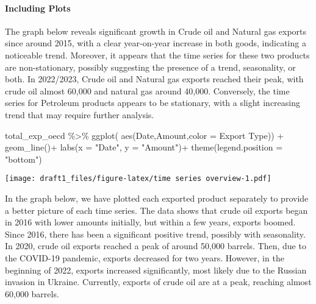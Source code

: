 \documentclass[
]{article}
\newenvironment{Shaded}{\begin{snugshade}}{\end{snugshade}}
\newcommand{\AttributeTok}[1]{\textcolor[rgb]{0.77,0.63,0.00}{#1}}
\newcommand{\FunctionTok}[1]{\textcolor[rgb]{0.00,0.00,0.00}{#1}}
\newcommand{\NormalTok}[1]{#1}
\newcommand{\SpecialCharTok}[1]{\textcolor[rgb]{0.00,0.00,0.00}{#1}}
\newcommand{\StringTok}[1]{\textcolor[rgb]{0.31,0.60,0.02}{#1}}
\begin{document}
\hypertarget{including-plots}{%
\paragraph{Including Plots}\label{including-plots}}

The graph below reveals significant growth in Crude oil and Natural gas
exports since around 2015, with a clear year-on-year increase in both
goods, indicating a noticeable trend. Moreover, it appears that the time
series for these two products are non-stationary, possibly suggesting
the presence of a trend, seasonality, or both. In 2022/2023, Crude oil
and Natural gas exports reached their peak, with crude oil almost 60,000
and natural gas around 40,000. Conversely, the time series for Petroleum
products appears to be stationary, with a slight increasing trend that
may require further analysis.

\begin{Shaded}
\begin{Highlighting}[]
\NormalTok{total\_exp\_oecd }\SpecialCharTok{\%\textgreater{}\%} \FunctionTok{ggplot}\NormalTok{(}
 \FunctionTok{aes}\NormalTok{(Date,Amount,}\AttributeTok{color =} \StringTok{\textasciigrave{}}\AttributeTok{Export Type}\StringTok{\textasciigrave{}}\NormalTok{)) }\SpecialCharTok{+}
   \FunctionTok{geom\_line}\NormalTok{()}\SpecialCharTok{+}
   \FunctionTok{labs}\NormalTok{(}\AttributeTok{x =} \StringTok{"Date"}\NormalTok{, }\AttributeTok{y =} \StringTok{"Amount"}\NormalTok{)}\SpecialCharTok{+}
  \FunctionTok{theme}\NormalTok{(}\AttributeTok{legend.position =} \StringTok{"bottom"}\NormalTok{)}
\end{Highlighting}
\end{Shaded}

\texttt{[image: draft1\_files/figure-latex/time series overview-1.pdf]}

In the graph below, we have plotted each exported product separately to
provide a better picture of each time series. The data shows that crude
oil exports began in 2016 with lower amounts initially, but within a few
years, exports boomed. Since 2016, there has been a significant positive
trend, possibly with seasonality. In 2020, crude oil exports reached a
peak of around 50,000 barrels. Then, due to the COVID-19 pandemic,
exports decreased for two years. However, in the beginning of 2022,
exports increased significantly, most likely due to the Russian invasion
in Ukraine. Currently, exports of crude oil are at a peak, reaching
almost 60,000 barrels.
\end{document}
